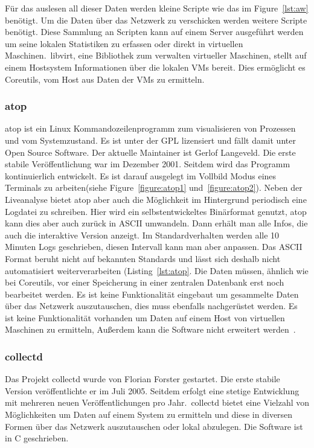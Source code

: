 Für das auslesen all dieser Daten werden kleine Scripte wie das im
Figure~\ref{lst:aw} benötigt. Um die Daten über das Netzwerk zu verschicken
werden weitere Scripte benötigt. Diese Sammlung an Scripten kann auf einem
Server ausgeführt werden um seine lokalen Statistiken zu erfassen oder direkt
in virtuellen Maschinen.\ libvirt, eine Bibliothek zum verwalten virtueller
Maschinen, stellt auf einem Hostsystem Informationen über die lokalen VMs
bereit. Dies ermöglicht es Coreutils, vom Host aus Daten der VMs zu ermitteln.
\tm%

\subsubsection{atop}
atop ist ein Linux Kommandozeilenprogramm zum visualisieren von Prozessen und
vom Systemzustand. Es ist unter der GPL lizensiert und fällt damit unter
Open Source Software. Der aktuelle Maintainer ist Gerlof Langeveld. Die erste
stabile Veröffentlichung war im Dezember 2001. Seitdem wird das Programm
kontinuierlich entwickelt. Es ist darauf ausgelegt im Vollbild Modus eines
Terminals zu arbeiten(siehe Figure~\ref{figure:atop1} und~\ref{figure:atop2}).
Neben der Liveanalyse bietet atop aber auch die Möglichkeit im Hintergrund
periodisch eine Logdatei zu schreiben. Hier wird ein selbstentwickeltes
Binärformat genutzt, atop kann dies aber auch zurück in ASCII umwandeln. Dann
erhält man alle Infos, die auch die interaktive Version anzeigt. Im
Standardverhalten werden alle 10 Minuten Logs geschrieben, diesen Intervall
kann man aber anpassen. Das ASCII Format beruht nicht auf bekannten Standards
und lässt sich deshalb nicht automatisiert weiterverarbeiten
(Listing~\ref{lst:atop}. Die Daten müssen, ähnlich wie bei Coreutils, vor einer
Speicherung in einer zentralen Datenbank erst noch bearbeitet werden. Es ist
keine Funktionalität eingebaut um gesammelte Daten über das Netzwerk
auszutauschen, dies muss ebenfalls nachgerüstet werden. Es ist keine
Funktionalität vorhanden um Daten auf einem Host von virtuellen Maschinen zu
ermitteln, Außerdem kann die Software nicht erweitert werden~\cite{atop}.
\tm%

\subsubsection{collectd}
Das Projekt collectd wurde von Florian Forster gestartet. Die erste stabile
Version veröffentlichte er im Juli 2005. Seitdem erfolgt eine stetige
Entwicklung mit mehreren neuen Veröffentlichungen pro Jahr.\ collectd bietet
eine Vielzahl von Möglichkeiten um Daten auf einem System zu ermitteln und
diese in diversen Formen über das Netzwerk auszutauschen oder lokal abzulegen.
Die Software ist in C geschrieben.

